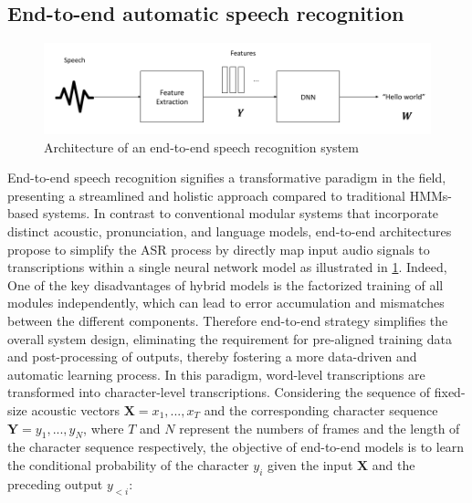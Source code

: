 \subsection{End-to-end automatic speech recognition} %
\begin{figure}
    \centering
    \includegraphics[width=\textwidth]{imgs/End2End_architeccture.png}
    \caption{Architecture of an end-to-end speech recognition system}
    \label{fig:e2e_archi}
\end{figure}
 End-to-end speech recognition signifies a transformative paradigm in the field, presenting a streamlined and holistic approach compared to traditional HMMs-based systems. In contrast to conventional modular systems that incorporate distinct acoustic, pronunciation, and language models, end-to-end architectures propose to simplify the ASR process by directly map input audio signals to transcriptions within a single neural network model as illustrated in \ref{fig:e2e_archi}. Indeed, One of the key disadvantages of hybrid models is the factorized training of all modules independently, which can lead to error accumulation and mismatches between the different components. Therefore end-to-end strategy simplifies the overall system design, eliminating the requirement for pre-aligned training data and post-processing of outputs, thereby fostering a more data-driven and automatic learning process.
 In this paradigm, word-level transcriptions are transformed into character-level transcriptions. Considering the sequence of fixed-size acoustic vectors $\boldsymbol{X}=x_1,...,x_T$ and the corresponding character sequence $\boldsymbol{Y}=y_1,...,y_N$, where $T$ and $N$ represent the numbers of frames and the length of the character sequence respectively, the objective of end-to-end models is to learn the conditional probability of the character $y_i$ given the input $\boldsymbol{X}$ and the preceding output $y_{<i}$:
